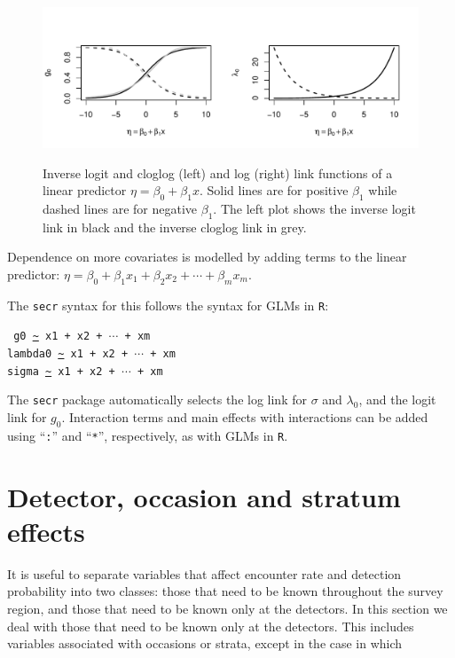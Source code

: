 \documentclass[graybox,envcountchap,sectrefs]{SpringerStyleFiles/styles/svmono}\usepackage[]{graphicx}\usepackage[]{color}
\begin{document}
\begin{figure}[ht]
\caption{\small Inverse logit and cloglog (left) and log (right) link functions of a linear predictor $\eta=\beta_0+\beta_1 x$. Solid lines are for positive $\beta_1$ while dashed lines are for negative $\beta_1$. The left plot shows the inverse logit link in black and the inverse cloglog link in grey.}
\centering
\vspace{-24pt}
\includegraphics[width=12cm]{keepfigure/linkfuns.pdf}
\label{fig:ERdetfun.linkfuns}
\end{figure}

Dependence on more covariates is modelled by adding terms to the linear predictor: $\eta=\beta_0 + \beta_1 x_1 + \beta_2 x_2 + \cdots + \beta_m x_m$. 




The \texttt{secr} syntax for this follows the syntax for GLMs in \texttt{R}:
\noindent
{\small
\begin{svgraybox}
\texttt{
g0 \url{~} x1 + x2 + $\cdots$ + xm \\
lambda0 \url{~} x1 + x2 + $\cdots$ + xm \\
sigma \url{~} x1 + x2 + $\cdots$ + xm 
}
\end{svgraybox}
}
\noindent
The \texttt{secr} package automatically selects the log link for $\sigma$ and $\lambda_0$, and the logit link for $g_0$. Interaction terms and main effects with interactions can be added using ``\texttt{:}'' and ``\texttt{*}'', respectively, as with GLMs in \texttt{R}.



\section{Detector, occasion and stratum effects}

It is useful to separate variables that affect encounter rate and detection probability into two classes: those that need to be known throughout the survey region, and those that need to be known only at the detectors. In this section we deal with those that need to be known only at the detectors. This includes variables associated with occasions or strata, except in the case in which 
\end{document}
